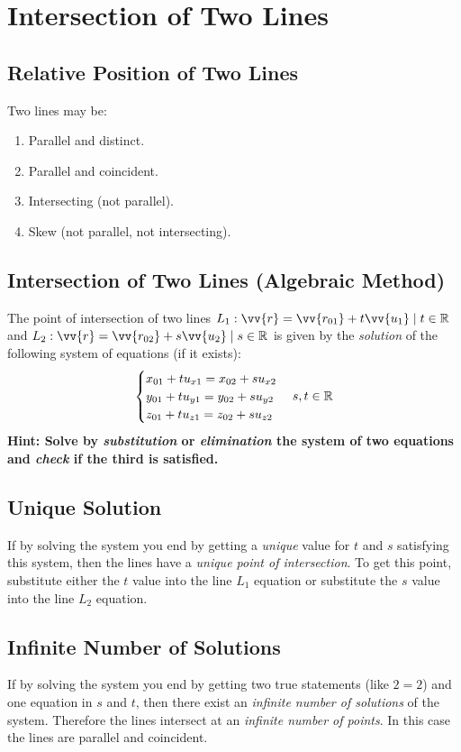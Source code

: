 \section{Intersection of Two Lines} \subsection{Relative Position of Two Lines}
	Two lines may be:
	\begin{enumerate}
		\item Parallel and distinct.
		\item Parallel and coincident.
		\item Intersecting (not parallel).
		\item Skew (not parallel, not intersecting).
	\end{enumerate}
\subsection{Intersection of Two Lines (Algebraic Method)}
	The point of intersection of two lines $L_1: \vv{r} = \vv{r_{01}} + t\vv{u_1} \such t \in \real$ and $L_2: \vv{r} = \vv{r_{02}} + s\vv{u_2} \such s \in \real$ is given by the \emph{solution} of the following system of equations (if it exists):
	\begin{equation*}
		\begin{cases}
			x_{01} + tu_{x1} = x_{02} + su_{x2}\\
			y_{01} + tu_{y1} = y_{02} + su_{y2}\\
			z_{01} + tu_{z1} = z_{02} + su_{z2}
		\end{cases}
		s, t \in \mathbb{R}
	\end{equation*}
	\textbf{Hint: Solve by \emph{substitution} or \emph{elimination} the system of two equations and \emph{check} if the third is satisfied.}
\subsection{Unique Solution}
	If by solving the system you end by getting a \emph{unique} value for $t$ and $s$ satisfying this system, then the lines have a \emph{unique point of intersection}.
	To get this point, substitute either the $t$ value into the line $L_1$ equation or substitute the $s$ value into the line $L_2$ equation.
\subsection{Infinite Number of Solutions}
	If by solving the system you end by getting two true statements (like $2=2$) and one equation in $s$ and $t$, then there exist an \emph{infinite number of solutions} of the system.
	Therefore the lines intersect at an \emph{infinite number of points}. 
	In this case the lines are parallel and coincident.
